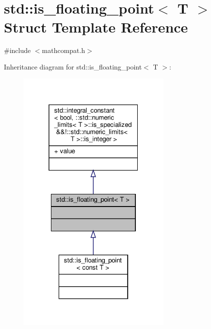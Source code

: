 \hypertarget{structstd_1_1is__floating__point}{}\section{std\+:\+:is\+\_\+floating\+\_\+point$<$ T $>$ Struct Template Reference}
\label{structstd_1_1is__floating__point}


{\ttfamily \#include $<$mathcompat.\+h$>$}



Inheritance diagram for std\+:\+:is\+\_\+floating\+\_\+point$<$ T $>$\+:\nopagebreak
\begin{figure}[H]
\begin{center}
\leavevmode
\includegraphics[width=217pt]{db/d25/structstd_1_1is__floating__point__inherit__graph}
\end{center}
\end{figure}


